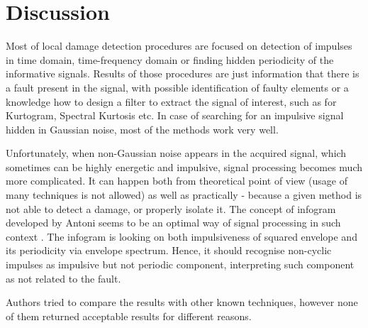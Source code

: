 \documentclass[3p,times]{elsarticle}
\begin{document}
\section{Discussion}\label{disc}




Most of local damage detection procedures are focused on detection of impulses in time domain, time-frequency domain or finding hidden periodicity of the informative signals. Results of those procedures are just information that there is a fault present in the signal, with possible identification of faulty elements or a knowledge how to design a filter to extract the signal of interest, such as for Kurtogram, Spectral Kurtosis etc. In case of searching for an impulsive signal hidden in Gaussian noise, most of the methods work very well.

Unfortunately, when non-Gaussian noise appears in the acquired signal, which sometimes can be highly energetic and impulsive, signal processing becomes much more complicated. It can happen both from theoretical point of view (usage of many techniques is not allowed) as well as practically - because a given method is not able to detect a damage, or properly isolate it. The concept of infogram developed by Antoni seems to be an optimal way of signal processing in such context \cite{antoni2016info}. The infogram is looking on both impulsiveness of squared envelope and its periodicity via envelope spectrum. Hence, it should recognise non-cyclic impulses as impulsive but not periodic component, interpreting such component as not related to the fault.


Authors tried to compare the results with other known techniques, however none of them returned acceptable results for different reasons.
\end{document}

